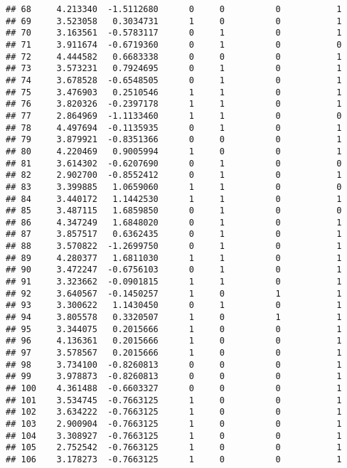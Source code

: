 \documentclass[
]{article}
\begin{document}
\begin{verbatim}
## 68     4.213340  -1.5112680      0     0          0           1
## 69     3.523058   0.3034731      1     0          0           1
## 70     3.163561  -0.5783117      0     1          0           1
## 71     3.911674  -0.6719360      0     1          0           0
## 72     4.444582   0.6683338      0     0          0           1
## 73     3.573231   0.7924695      0     1          0           1
## 74     3.678528  -0.6548505      0     1          0           1
## 75     3.476903   0.2510546      1     1          0           1
## 76     3.820326  -0.2397178      1     1          0           1
## 77     2.864969  -1.1133460      1     1          0           0
## 78     4.497694  -0.1135935      0     1          0           1
## 79     3.879921  -0.8351366      0     0          0           1
## 80     4.220469   0.9005994      1     0          0           1
## 81     3.614302  -0.6207690      0     1          0           0
## 82     2.902700  -0.8552412      0     1          0           1
## 83     3.399885   1.0659060      1     1          0           0
## 84     3.440172   1.1442530      1     1          0           1
## 85     3.487115   1.6859850      0     1          0           0
## 86     4.347249   1.6848020      0     1          0           1
## 87     3.857517   0.6362435      0     1          0           1
## 88     3.570822  -1.2699750      0     1          0           1
## 89     4.280377   1.6811030      1     1          0           1
## 90     3.472247  -0.6756103      0     1          0           1
## 91     3.323662  -0.0901815      1     1          0           1
## 92     3.640567  -0.1450257      1     0          1           1
## 93     3.300622   1.1430450      0     1          0           1
## 94     3.805578   0.3320507      1     0          1           1
## 95     3.344075   0.2015666      1     0          0           1
## 96     4.136361   0.2015666      1     0          0           1
## 97     3.578567   0.2015666      1     0          0           1
## 98     3.734100  -0.8260813      0     0          0           1
## 99     3.978873  -0.8260813      0     0          0           1
## 100    4.361488  -0.6603327      0     0          0           1
## 101    3.534745  -0.7663125      1     0          0           1
## 102    3.634222  -0.7663125      1     0          0           1
## 103    2.900904  -0.7663125      1     0          0           1
## 104    3.308927  -0.7663125      1     0          0           1
## 105    2.752542  -0.7663125      1     0          0           1
## 106    3.178273  -0.7663125      1     0          0           1

\end{verbatim}
\end{document}

